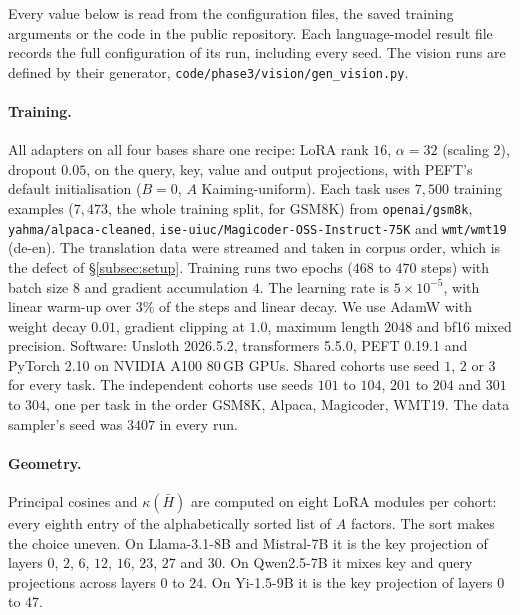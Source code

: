 Every value below is read from the configuration files, the saved training
arguments or the code in the public repository. Each language-model result
file records the full configuration of its run, including every seed. The vision runs are defined by their generator,
\texttt{code/phase3/vision/gen\_vision.py}.

\paragraph{Training.} All adapters on all four bases share one recipe: LoRA
rank $16$, $\alpha = 32$ (scaling $2$), dropout $0.05$, on the query, key,
value and output projections, with PEFT's default initialisation ($B = 0$, $A$
Kaiming-uniform). Each task uses $7{,}500$ training examples ($7{,}473$, the
whole training split, for GSM8K) from \texttt{openai/gsm8k},
\texttt{yahma/alpaca-cleaned}, \texttt{ise-uiuc/Magicoder-OSS-Instruct-75K} and
\texttt{wmt/wmt19} (de-en). The translation data were streamed and taken in
corpus order, which is the defect of \S\ref{subsec:setup}. Training runs two
epochs ($468$ to $470$ steps) with batch size $8$ and gradient accumulation
$4$. The learning rate is $5\times10^{-5}$, with linear warm-up over $3\%$ of
the steps and linear decay. We use AdamW with weight decay $0.01$, gradient
clipping at $1.0$, maximum length $2048$ and bf16 mixed precision. Software:
Unsloth 2026.5.2, transformers 5.5.0, PEFT 0.19.1 and PyTorch 2.10 on NVIDIA
A100 80\,GB GPUs. Shared cohorts use seed $1$, $2$ or $3$ for every task. The
independent cohorts use seeds $101$ to $104$, $201$ to $204$ and $301$ to
$304$, one per task in the order GSM8K, Alpaca, Magicoder, WMT19. The data
sampler's seed was $3407$ in every run.

\paragraph{Geometry.} Principal cosines and $\kappa(\bar H)$ are computed on
eight LoRA modules per cohort: every eighth entry of the alphabetically sorted
list of $A$ factors. The sort makes the choice uneven. On Llama-3.1-8B and
Mistral-7B it is the key projection of layers $0$, $2$, $6$, $12$, $16$, $23$,
$27$ and $30$. On Qwen2.5-7B it mixes key and query projections across layers
$0$ to $24$. On Yi-1.5-9B it is the key projection of layers $0$ to $47$.

